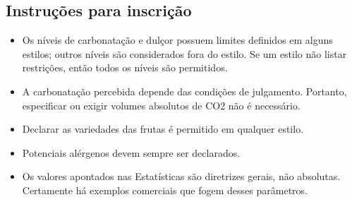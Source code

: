 \subsection*{Instruções para inscrição}

\begin{itemize}
\item Os níveis de carbonatação e dulçor possuem limites definidos em alguns estilos; outros níveis são considerados fora do estilo. Se um estilo não listar restrições, então todos os níveis são permitidos.
\item A carbonatação percebida depende das condições de julgamento. Portanto, especificar ou exigir volumes absolutos de CO2 não é necessário.
\item Declarar as variedades das frutas é permitido em qualquer estilo.
\item Potenciais alérgenos devem sempre ser declarados.
\item Os valores apontados nas Estatísticas são diretrizes gerais, não absolutas. Certamente há exemplos comerciais que fogem desses parâmetros.
\end{itemize}
